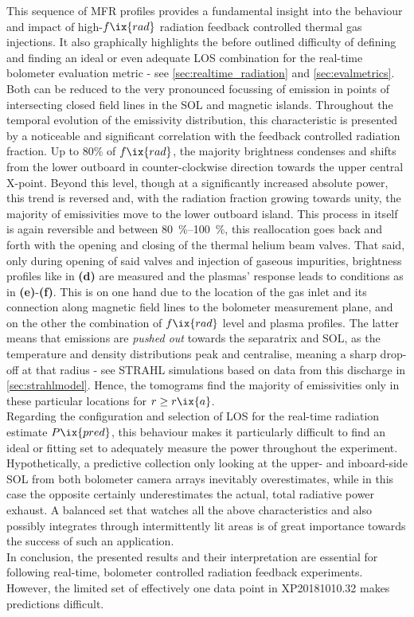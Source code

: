             This sequence of MFR profiles provides a fundamental insight into the behaviour and impact of high-$f\ix{rad}$ radiation feedback controlled thermal gas injections. It also graphically highlights the before outlined difficulty of defining and finding an ideal or even adequate LOS combination for the real-time bolometer evaluation metric - see \cref{sec:realtime_radiation} and \cref{sec:evalmetrics}. Both can be reduced to the very pronounced focussing of emission in points of intersecting closed field lines in the SOL and magnetic islands. Throughout the temporal evolution of the emissivity distribution, this characteristic is presented by a noticeable and significant correlation with the feedback controlled radiation fraction. Up to 80\% of $f\ix{rad}$, the majority brightness condenses and shifts from the lower outboard in counter-clockwise direction towards the upper central X-point. Beyond this level, though at a significantly increased absolute power, this trend is reversed and, with the radiation fraction growing towards unity, the majority of emissivities move to the lower outboard island. This process in itself is again reversible and between \SIrange{80}{100}{\percent}, this reallocation goes back and forth with the opening and closing of the thermal helium beam valves. That said, only during opening of said valves and injection of gaseous impurities, brightness profiles like in \textbf{(d)} are measured and the plasmas' response leads to conditions as in \textbf{(e)}-\textbf{(f)}. This is on one hand due to the location of the gas inlet and its connection along magnetic field lines to the bolometer measurement plane, and on the other the combination of $f\ix{rad}$ level and plasma profiles. The latter means that emissions are \textit{pushed out} towards the separatrix and SOL, as the temperature and density distributions peak and centralise, meaning a sharp drop-off at that radius - see STRAHL simulations based on data from this discharge in \cref{sec:strahlmodel}. Hence, the tomograms find the majority of emissivities only in these particular locations for $r\ge r\ix{a}$.\\%
            Regarding the configuration and selection of LOS for the real-time radiation estimate $P\ix{pred}$, this behaviour makes it particularly difficult to find an ideal or fitting set to adequately measure the power throughout the experiment. Hypothetically, a predictive collection only looking at the upper- and inboard-side SOL from both bolometer camera arrays inevitably overestimates, while in this case the opposite certainly underestimates the actual, total radiative power exhaust. A balanced set that watches all the above characteristics and also possibly integrates through intermittently lit areas is of great importance towards the success of such an application.\\%
            In conclusion, the presented results and their interpretation are essential for following real-time, bolometer controlled radiation feedback experiments. However, the limited set of effectively one data point in XP20181010.32 makes predictions difficult.%
%
